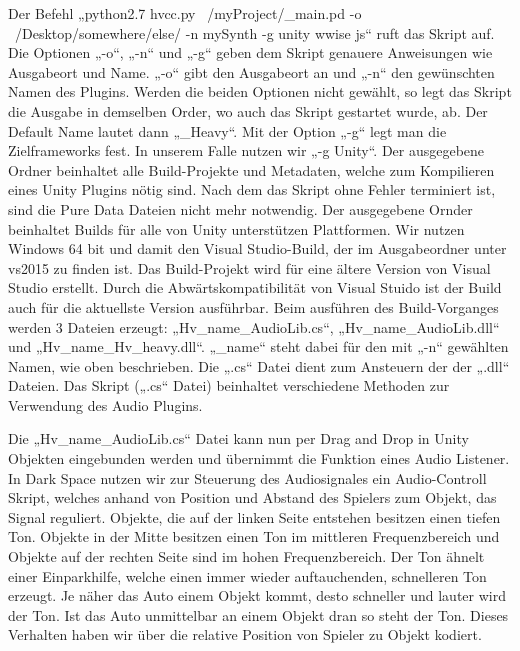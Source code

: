 \documentclass[a4paper, 11pt]{scrartcl}
\begin{document}
Der Befehl „python2.7 hvcc.py ~/myProject/\_main.pd -o ~/Desktop/somewhere/else/
-n mySynth -g unity wwise js“ ruft das Skript auf. Die Optionen „-o“, „-n“ und
„-g“ geben dem Skript genauere Anweisungen wie Ausgabeort und Name.  „-o“ gibt
den Ausgabeort an und „-n“ den gewünschten Namen des Plugins. Werden die beiden
Optionen nicht gewählt, so legt das Skript die Ausgabe in demselben Order, wo
auch das Skript gestartet wurde, ab. Der Default Name lautet dann „\_Heavy“. Mit
der Option „-g“ legt man die Zielframeworks fest. In unserem Falle nutzen wir
„-g Unity“. Der ausgegebene Ordner beinhaltet alle Build-Projekte und Metadaten,
welche zum Kompilieren eines Unity Plugins nötig sind. Nach dem das Skript ohne
Fehler terminiert ist, sind die Pure Data Dateien nicht mehr notwendig. Der
ausgegebene Ornder beinhaltet Builds für alle von Unity unterstützen
Plattformen. Wir nutzen Windows 64 bit und damit den Visual Studio-Build, der im
Ausgabeordner unter vs2015 zu finden ist. Das Build-Projekt wird für eine ältere
Version von Visual Studio erstellt. Durch die Abwärtskompatibilität von Visual
Stuido ist der Build auch für die aktuellste Version ausführbar.  Beim ausführen
des Build-Vorganges werden 3 Dateien erzeugt: „Hv\_name\_AudioLib.cs“,
„Hv\_name\_AudioLib.dll“ und „Hv\_name\_Hv\_heavy.dll“.  „\_name“ steht dabei
für den mit „-n“ gewählten Namen, wie oben beschrieben.  Die „.cs“ Datei dient
zum Ansteuern der der „.dll“ Dateien. Das Skript („.cs“ Datei) beinhaltet
verschiedene Methoden zur Verwendung des Audio Plugins. 

Die „Hv\_name\_AudioLib.cs“ Datei kann nun per Drag and Drop in Unity Objekten
eingebunden werden und übernimmt die Funktion eines Audio Listener.
In Dark Space nutzen wir zur Steuerung des Audiosignales ein Audio-Controll Skript, welches anhand von Position und Abstand des Spielers zum Objekt, das Signal reguliert. Objekte, die auf der linken Seite entstehen besitzen einen tiefen Ton. Objekte in der Mitte besitzen einen Ton im mittleren Frequenzbereich und Objekte auf der rechten Seite sind im hohen Frequenzbereich. Der Ton ähnelt einer Einparkhilfe, welche einen immer wieder auftauchenden, schnelleren Ton erzeugt. Je näher das Auto einem Objekt kommt, desto schneller und lauter wird der Ton. Ist das Auto unmittelbar an einem Objekt dran so steht der Ton. Dieses Verhalten haben wir über die relative Position von Spieler zu Objekt kodiert. 
\end{document}
